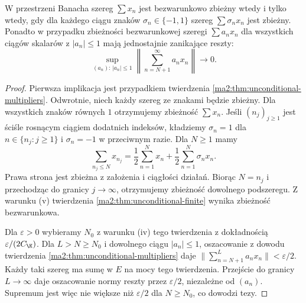 \begin{wniosek}
\label{ma2:cor:unconditional-signs}
W przestrzeni Banacha szereg $\sum x_n$ jest bezwarunkowo
zbieżny wtedy i tylko wtedy, gdy dla każdego ciągu
znaków $\sigma_n\in\{-1,1\}$ szereg $\sum\sigma_n x_n$
jest zbieżny. Ponadto w przypadku zbieżności bezwarunkowej
szeregi $\sum a_nx_n$ dla wszystkich ciągów skalarów
z $|a_n|\le1$ mają jednostajnie zanikające reszty:
\[
 \sup_{(a_n):\,|a_n|\le1}
 \left\|\sum_{n=N+1}^{\infty} a_nx_n\right\|\longrightarrow0.
\]
\end{wniosek}
\begin{proof}
Pierwsza implikacja jest przypadkiem twierdzenia
\ref{ma2:thm:unconditional-multipliers}.
Odwrotnie, niech każdy szereg ze znakami będzie zbieżny.
Dla wszystkich znaków równych $1$ otrzymujemy zbieżność
$\sum x_n$. Jeśli $(n_j)_{j\ge1}$ jest ściśle rosnącym
ciągiem dodatnich indeksów, kładziemy $\sigma_n=1$ dla
$n\in\{n_j:j\ge1\}$ i $\sigma_n=-1$ w przeciwnym razie.
Dla $N\ge1$ mamy
\[
 \sum_{n_j\le N}x_{n_j}
 =\frac12\sum_{n=1}^N x_n+
  \frac12\sum_{n=1}^N\sigma_nx_n.
\]
Prawa strona jest zbieżna z założenia i ciągłości działań.
Biorąc $N=n_j$ i przechodząc do granicy $j\to\infty$,
otrzymujemy zbieżność dowolnego podszeregu.
Z warunku (v) twierdzenia \ref{ma2:thm:unconditional-finite}
wynika zbieżność bezwarunkowa.

Dla $\varepsilon>0$ wybieramy $N_0$ z warunku (iv)
tego twierdzenia z dokładnością
$\varepsilon/(2C_{\K})$. Dla $L>N\ge N_0$ i dowolnego
ciągu $|a_n|\le1$, oszacowanie z dowodu twierdzenia
\ref{ma2:thm:unconditional-multipliers} daje
$\|\sum_{n=N+1}^L a_nx_n\|<\varepsilon/2$.
Każdy taki szereg ma sumę w $E$ na mocy tego twierdzenia.
Przejście do granicy $L\to\infty$ daje oszacowanie normy
reszty przez $\varepsilon/2$, niezależne od $(a_n)$.
Supremum jest więc nie większe niż $\varepsilon/2$
dla $N\ge N_0$, co dowodzi tezy.
\end{proof}

